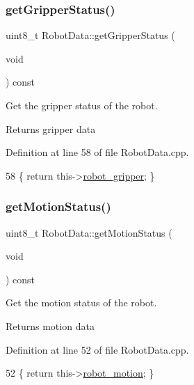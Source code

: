\subsubsection{\texorpdfstring{get\+Gripper\+Status()}{getGripperStatus()}}
{\footnotesize\ttfamily uint8\+\_\+t Robot\+Data\+::get\+Gripper\+Status (\begin{DoxyParamCaption}\item[{void}]{ }\end{DoxyParamCaption}) const}



Get the gripper status of the robot. 

\begin{DoxyReturn}{Returns}
gripper data 
\end{DoxyReturn}


Definition at line 58 of file Robot\+Data.\+cpp.


\begin{DoxyCode}
58 \{ \textcolor{keywordflow}{return} this->\hyperlink{class_robot_data_a83aa1b34c8785aa24e1fc358e50dfc26}{robot\_gripper}; \}
\end{DoxyCode}
\mbox{\label{class_robot_data_a205c431df25f99c15f39e81fd6a58116}} 
\subsubsection{\texorpdfstring{get\+Motion\+Status()}{getMotionStatus()}}
{\footnotesize\ttfamily uint8\+\_\+t Robot\+Data\+::get\+Motion\+Status (\begin{DoxyParamCaption}\item[{void}]{ }\end{DoxyParamCaption}) const}



Get the motion status of the robot. 

\begin{DoxyReturn}{Returns}
motion data 
\end{DoxyReturn}


Definition at line 52 of file Robot\+Data.\+cpp.


\begin{DoxyCode}
52 \{ \textcolor{keywordflow}{return} this->\hyperlink{class_robot_data_aaa03c73d21d0d28a8b1b3d384d777a1e}{robot\_motion}; \}
\end{DoxyCode}
\mbox{\label{class_robot_data_a42b8405b817f03340f575f1ca97d2721}} 
